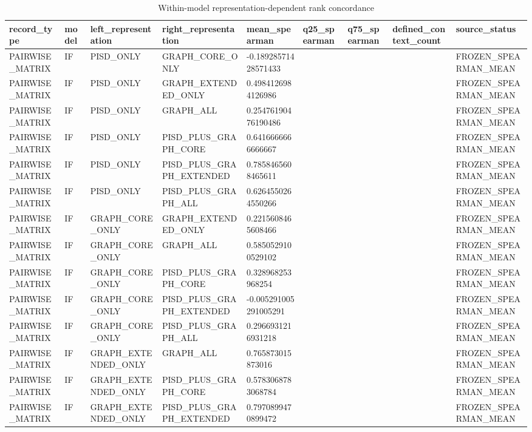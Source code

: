 \begin{longtable}{lllllllll}
\caption{Within-model representation-dependent rank concordance}\\
\hline
record\_type & model & left\_representation & right\_representation & mean\_spearman & q25\_spearman & q75\_spearman & defined\_context\_count & source\_status \\
\hline
PAIRWISE\_MATRIX & IF & PISD\_ONLY & GRAPH\_CORE\_ONLY & -0.18928571428571433 &  &  &  & FROZEN\_SPEARMAN\_MEAN \\
PAIRWISE\_MATRIX & IF & PISD\_ONLY & GRAPH\_EXTENDED\_ONLY & 0.4984126984126986 &  &  &  & FROZEN\_SPEARMAN\_MEAN \\
PAIRWISE\_MATRIX & IF & PISD\_ONLY & GRAPH\_ALL & 0.25476190476190486 &  &  &  & FROZEN\_SPEARMAN\_MEAN \\
PAIRWISE\_MATRIX & IF & PISD\_ONLY & PISD\_PLUS\_GRAPH\_CORE & 0.6416666666666667 &  &  &  & FROZEN\_SPEARMAN\_MEAN \\
PAIRWISE\_MATRIX & IF & PISD\_ONLY & PISD\_PLUS\_GRAPH\_EXTENDED & 0.7858465608465611 &  &  &  & FROZEN\_SPEARMAN\_MEAN \\
PAIRWISE\_MATRIX & IF & PISD\_ONLY & PISD\_PLUS\_GRAPH\_ALL & 0.6264550264550266 &  &  &  & FROZEN\_SPEARMAN\_MEAN \\
PAIRWISE\_MATRIX & IF & GRAPH\_CORE\_ONLY & GRAPH\_EXTENDED\_ONLY & 0.2215608465608466 &  &  &  & FROZEN\_SPEARMAN\_MEAN \\
PAIRWISE\_MATRIX & IF & GRAPH\_CORE\_ONLY & GRAPH\_ALL & 0.5850529100529102 &  &  &  & FROZEN\_SPEARMAN\_MEAN \\
PAIRWISE\_MATRIX & IF & GRAPH\_CORE\_ONLY & PISD\_PLUS\_GRAPH\_CORE & 0.328968253968254 &  &  &  & FROZEN\_SPEARMAN\_MEAN \\
PAIRWISE\_MATRIX & IF & GRAPH\_CORE\_ONLY & PISD\_PLUS\_GRAPH\_EXTENDED & -0.005291005291005291 &  &  &  & FROZEN\_SPEARMAN\_MEAN \\
PAIRWISE\_MATRIX & IF & GRAPH\_CORE\_ONLY & PISD\_PLUS\_GRAPH\_ALL & 0.2966931216931218 &  &  &  & FROZEN\_SPEARMAN\_MEAN \\
PAIRWISE\_MATRIX & IF & GRAPH\_EXTENDED\_ONLY & GRAPH\_ALL & 0.765873015873016 &  &  &  & FROZEN\_SPEARMAN\_MEAN \\
PAIRWISE\_MATRIX & IF & GRAPH\_EXTENDED\_ONLY & PISD\_PLUS\_GRAPH\_CORE & 0.5783068783068784 &  &  &  & FROZEN\_SPEARMAN\_MEAN \\
PAIRWISE\_MATRIX & IF & GRAPH\_EXTENDED\_ONLY & PISD\_PLUS\_GRAPH\_EXTENDED & 0.7970899470899472 &  &  &  & FROZEN\_SPEARMAN\_MEAN \\

\end{longtable}
